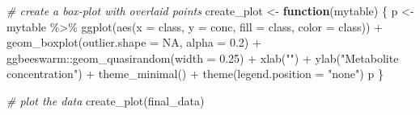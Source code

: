 \documentclass[smallextended]{svjour3}       %
\newenvironment{Shaded}{\begin{snugshade}}{\end{snugshade}}
\newcommand{\AttributeTok}[1]{\textcolor[rgb]{0.77,0.63,0.00}{#1}}
\newcommand{\CommentTok}[1]{\textcolor[rgb]{0.56,0.35,0.01}{\textit{#1}}}
\newcommand{\ConstantTok}[1]{\textcolor[rgb]{0.00,0.00,0.00}{#1}}
\newcommand{\ControlFlowTok}[1]{\textcolor[rgb]{0.13,0.29,0.53}{\textbf{#1}}}
\newcommand{\FloatTok}[1]{\textcolor[rgb]{0.00,0.00,0.81}{#1}}
\newcommand{\FunctionTok}[1]{\textcolor[rgb]{0.00,0.00,0.00}{#1}}
\newcommand{\NormalTok}[1]{#1}
\newcommand{\OtherTok}[1]{\textcolor[rgb]{0.56,0.35,0.01}{#1}}
\newcommand{\SpecialCharTok}[1]{\textcolor[rgb]{0.00,0.00,0.00}{#1}}
\newcommand{\StringTok}[1]{\textcolor[rgb]{0.31,0.60,0.02}{#1}}
\begin{document}
\begin{Shaded}
\begin{Highlighting}[]
\CommentTok{\# create a box{-}plot with overlaid points}
\NormalTok{create\_plot }\OtherTok{\textless{}{-}} \ControlFlowTok{function}\NormalTok{(mytable) \{}
\NormalTok{  p }\OtherTok{\textless{}{-}}\NormalTok{ mytable }\SpecialCharTok{\%\textgreater{}\%} 
    \FunctionTok{ggplot}\NormalTok{(}\FunctionTok{aes}\NormalTok{(}\AttributeTok{x =}\NormalTok{ class, }\AttributeTok{y =}\NormalTok{ conc, }\AttributeTok{fill =}\NormalTok{ class, }\AttributeTok{color =}\NormalTok{ class)) }\SpecialCharTok{+}
    \FunctionTok{geom\_boxplot}\NormalTok{(}\AttributeTok{outlier.shape =} \ConstantTok{NA}\NormalTok{, }\AttributeTok{alpha =} \FloatTok{0.2}\NormalTok{) }\SpecialCharTok{+}
\NormalTok{    ggbeeswarm}\SpecialCharTok{::}\FunctionTok{geom\_quasirandom}\NormalTok{(}\AttributeTok{width =} \FloatTok{0.25}\NormalTok{) }\SpecialCharTok{+} 
    \FunctionTok{xlab}\NormalTok{(}\StringTok{""}\NormalTok{) }\SpecialCharTok{+}
    \FunctionTok{ylab}\NormalTok{(}\StringTok{"Metabolite concentration"}\NormalTok{) }\SpecialCharTok{+} 
    \FunctionTok{theme\_minimal}\NormalTok{() }\SpecialCharTok{+}
    \FunctionTok{theme}\NormalTok{(}\AttributeTok{legend.position =} \StringTok{"none"}\NormalTok{)}
\NormalTok{  p}
\NormalTok{\}}
\end{Highlighting}
\end{Shaded}

\begin{Shaded}
\begin{Highlighting}[]
\CommentTok{\# plot the data}
\FunctionTok{create\_plot}\NormalTok{(final\_data)}
\end{Highlighting}
\end{Shaded}
\end{document}
